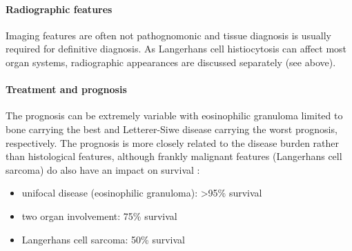\paragraph{Radiographic features}

Imaging features are often not pathognomonic and tissue diagnosis is usually required for definitive diagnosis. As Langerhans cell histiocytosis can affect most organ systems, radiographic appearances are discussed separately (see above).

\paragraph{Treatment and prognosis}

The prognosis can be extremely variable with eosinophilic granuloma limited to bone carrying the best and Letterer-Siwe disease carrying the worst prognosis, respectively. The prognosis is more closely related to the disease burden rather than histological features, although frankly malignant features (Langerhans cell sarcoma) do also have an impact on survival :

\begin{itemize}
	\item
	unifocal disease (eosinophilic granuloma): \textgreater95\% survival
	\item
	two organ involvement: 75\% survival
	\item
	Langerhans cell sarcoma: 50\% survival
\end{itemize}